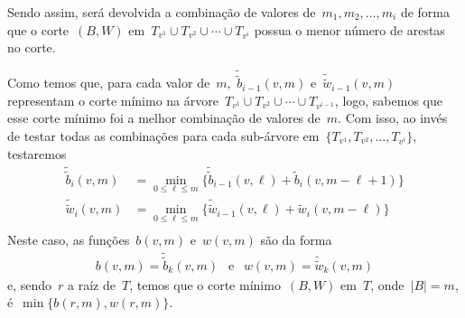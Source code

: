 \begin{itemize}
\begin{table}[h]
\begin{tabular}{| c | c | c | c | c|}
		\end{tabular}
	\end{table}

	Sendo assim, será devolvida a combinação de valores de~$m_1,m_2,\ldots,m_i$ 
	de forma que o corte~$(B,W)$ em~$T_{v^1}\cup T_{v^2}\cup\cdots\cup T_{v^i}$  
	possua o menor número de arestas no corte.

	Como temos que, para cada valor 
	de~$m$,~$\tilde{\tilde{b}}_{i-1}(v,m)$
	e~$\tilde{\tilde{w}}_{i-1}(v,m)$ representam
	o corte mínimo na 
	árvore~${T_{v^1}\cup T_{v^2}\cup \cdots \cup T_{v^{i-1}}}$,
	logo, sabemos que esse corte mínimo foi
	a melhor combinação de valores de~$m$.
	Com isso, ao invés de testar todas as combinações
	para cada sub-árvore em~$\{ T_{v^1}, T_{v^2},\ldots, T_{v^i} \}$,
	testaremos 
	\begin{align*}
		\tilde{\tilde{b}}_{i}(v,m) &= 
			\min_{0\le\ell\le m} \{ \tilde{\tilde{b}}_{i-1}(v,\ell) + 
			\tilde{b}_i(v, m-\ell +1) \} \nonumber \\
		\tilde{\tilde{w}}_{i}(v,m) &= 
			\min_{0\le\ell\le m} \{ \tilde{\tilde{w}}_{i-1}(v,\ell) + 
			\tilde{w}_i(v, m-\ell) \} \nonumber \\
	\end{align*}
	Neste caso, as funções~$b(v,m)$ e~$w(v,m)$ são da forma
	\begin{align*}
		b(v,m) = \tilde{\tilde{b}}_k(v,m)\ \ \text{ e }\ \
		w(v,m) = \tilde{\tilde{w}}_k(v,m) \nonumber
	\end{align*}
	e, sendo~$r$ a raíz de~$T$, temos que
	 o corte mínimo~$(B,W)$ em~$T$, onde~${|B|=m}$, 
	é~$\min\{b(r,m), w(r,m)\}$.
\end{itemize}